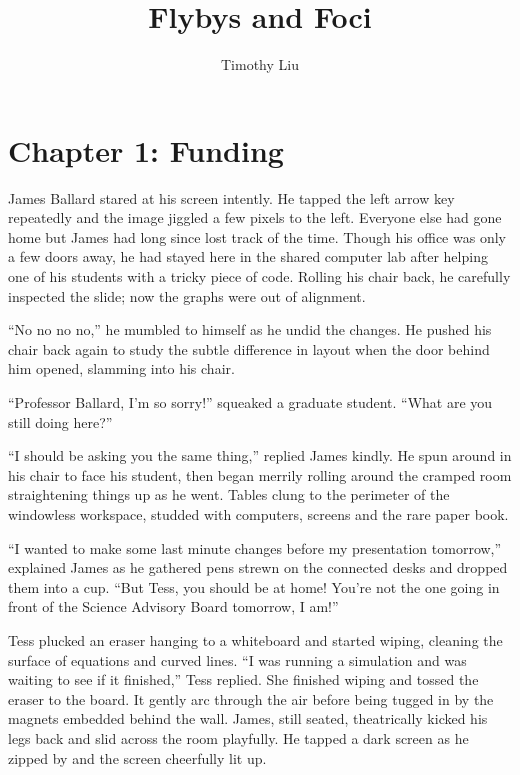 \documentclass[12pt]{article} %
\title{Flybys and Foci}
\author{Timothy Liu}
\begin{document}
\maketitle

\tableofcontents
\newpage

\section{Chapter 1: Funding}
James Ballard stared at his screen intently. He tapped the left arrow key repeatedly and the image jiggled a few pixels to the left. Everyone else had gone home but James had long since lost track of the time. Though his office was only a few doors away, he had stayed here in the shared computer lab after helping one of his students with a tricky piece of code. Rolling his chair back, he carefully inspected the slide; now the graphs were out of alignment.

``No no no no,'' he mumbled to himself as he undid the changes. He pushed his chair back again to study the subtle difference in layout when the door behind him opened, slamming into his chair.

``Professor Ballard, I'm so sorry!'' squeaked a graduate student. ``What are you still doing here?''

``I should be asking you the same thing,'' replied James kindly. He spun around in his chair to face his student, then began merrily rolling around the cramped room straightening things up as he went. Tables clung to the perimeter of the windowless workspace, studded with computers, screens and the rare paper book.

``I wanted to make some last minute changes before my presentation tomorrow,'' explained James as he gathered pens strewn on the connected desks and dropped them into a cup. ``But Tess, you should be at home! You're not the one going in front of the Science Advisory Board tomorrow, I am!''

Tess plucked an eraser hanging to a whiteboard and started wiping, cleaning the surface of equations and curved lines. ``I was running a simulation and was waiting to see if it finished,'' Tess replied. She finished wiping and tossed the eraser to the board. It gently arc through the air before being tugged in by the magnets embedded behind the wall. James, still seated, theatrically kicked his legs back  and slid across the room playfully. He tapped a dark screen as he zipped by and the screen cheerfully lit up.
\end{document}
